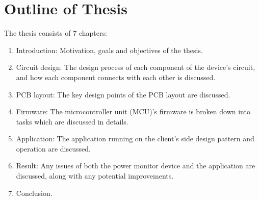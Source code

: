 \documentclass[main.tex]{subfiles}
\begin{document}
    \pagebreak
    \section{Outline of Thesis}
    \justify
    The thesis consists of 7 chapters:

    \begin{enumerate}[label=\textbf{Chapter \arabic*}, leftmargin=*]
        \item Introduction: \newline Motivation, goals and objectives of the thesis.
        \item Circuit design: \newline The design process of each component of the device's circuit, and how each component connects with each other is discussed.
        \item PCB layout: \newline The key design points of the PCB layout are discussed.
        \item Firmware: \newline The microcontroller unit (MCU)'s firmware is broken down into tasks which are discussed in details.
        \item Application: \newline The application running on the client's side design pattern and operation are discussed.
        \item Result: \newline Any issues of both the power monitor device and the application are discussed, along with any potential improvements.
        \item Conclusion.
    \end{enumerate}
\end{document}
